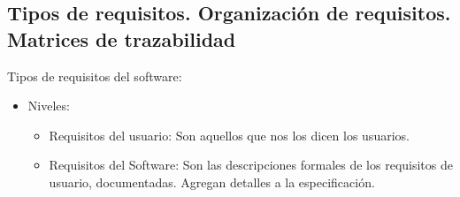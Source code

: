 \documentclass[12pt, twoside, openright]{report} %
\begin{document}
\subsection{Tipos de requisitos. Organización de requisitos. Matrices de trazabilidad}


    Tipos de requisitos del software:

    \begin{itemize}
    \item
      Niveles:

      \begin{itemize}
      
      \item
        Requisitos del usuario: Son aquellos que nos los dicen los
        usuarios.
		\item
		Requisitos del Software: Son las descripciones formales de los
		requisitos de usuario, documentadas. Agregan detalles a la
		especificación.
	


\end{itemize}
\end{itemize}
\end{document}
